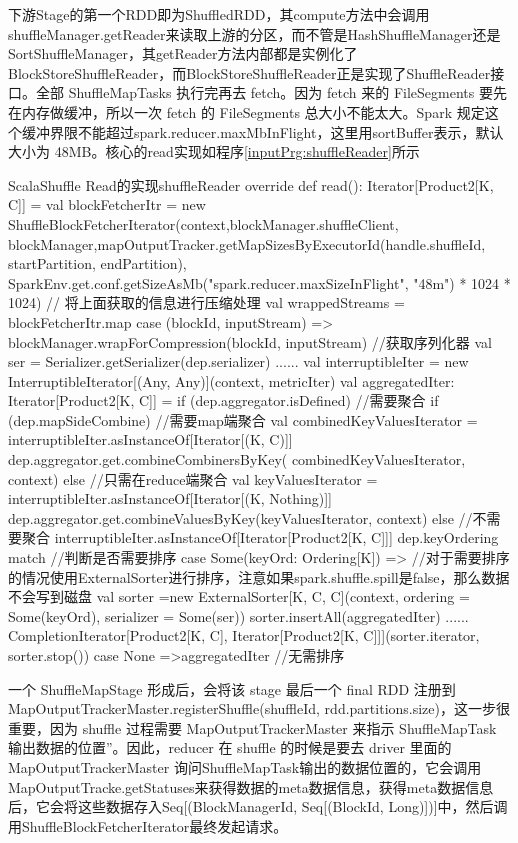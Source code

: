 下游Stage的第一个RDD即为ShuffledRDD，其compute方法中会调用shuffleManager.getReader来读取上游的分区，而不管是HashShuffleManager还是SortShuffleManager，其getReader方法内部都是实例化了BlockStoreShuffleReader，而BlockStoreShuffleReader正是实现了ShuffleReader接口。全部 ShuffleMapTasks 执行完再去 fetch。因为 fetch 来的 FileSegments 要先在内存做缓冲，所以一次 fetch 的 FileSegments 总大小不能太大。Spark 规定这个缓冲界限不能超过spark.reducer.maxMbInFlight，这里用sortBuffer表示，默认大小为 48MB。核心的read实现如程序\ref{inputPrg:shuffleReader}所示
\begin{codeInput}{Scala}{Shuffle Read的实现}{shuffleReader}
override def read(): Iterator[Product2[K, C]] = {
val blockFetcherItr = new ShuffleBlockFetcherIterator(context,blockManager.shuffleClient,
blockManager,mapOutputTracker.getMapSizesByExecutorId(handle.shuffleId, startPartition, endPartition),
  SparkEnv.get.conf.getSizeAsMb("spark.reducer.maxSizeInFlight", "48m") * 1024 * 1024)
  // 将上面获取的信息进行压缩处理
  val wrappedStreams = blockFetcherItr.map { case (blockId, inputStream) =>
    blockManager.wrapForCompression(blockId, inputStream)
  }
  //获取序列化器
  val ser = Serializer.getSerializer(dep.serializer)
  ......
  val interruptibleIter = new InterruptibleIterator[(Any, Any)](context, metricIter)	
  val aggregatedIter: Iterator[Product2[K, C]] = if (dep.aggregator.isDefined) {//需要聚合
    if (dep.mapSideCombine) {//需要map端聚合
      val combinedKeyValuesIterator = interruptibleIter.asInstanceOf[Iterator[(K, C)]]
      dep.aggregator.get.combineCombinersByKey(
      combinedKeyValuesIterator, context)
    } else {//只需在reduce端聚合
      val keyValuesIterator = interruptibleIter.asInstanceOf[Iterator[(K, Nothing)]]
      dep.aggregator.get.combineValuesByKey(keyValuesIterator, context)
    }
  } else {//不需要聚合
    interruptibleIter.asInstanceOf[Iterator[Product2[K, C]]]
  }
  dep.keyOrdering match {//判断是否需要排序
    case Some(keyOrd: Ordering[K]) =>
    //对于需要排序的情况使用ExternalSorter进行排序，注意如果spark.shuffle.spill是false，那么数据不会写到磁盘
      val sorter =new ExternalSorter[K, C, C](context, ordering = Some(keyOrd), serializer = Some(ser))
      sorter.insertAll(aggregatedIter)
      ......
      CompletionIterator[Product2[K, C], Iterator[Product2[K, C]]](sorter.iterator, sorter.stop())
    case None =>aggregatedIter
    //无需排序
  }
}
\end{codeInput}

一个 ShuffleMapStage 形成后，会将该 stage 最后一个 final RDD 注册到 MapOutputTrackerMaster.registerShuffle(shuffleId, rdd.partitions.size)，这一步很重要，因为 shuffle 过程需要 MapOutputTrackerMaster 来指示 ShuffleMapTask 输出数据的位置”。因此，reducer 在 shuffle 的时候是要去 driver 里面的 MapOutputTrackerMaster 询问ShuffleMapTask输出的数据位置的，它会调用MapOutputTracke.getStatuses来获得数据的meta数据信息，获得meta数据信息后，它会将这些数据存入Seq[(BlockManagerId, Seq[(BlockId, Long)])]中，然后调用ShuffleBlockFetcherIterator最终发起请求。

